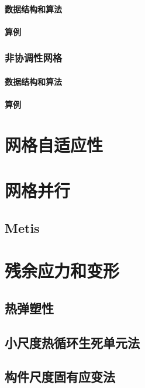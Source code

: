 \subsubsection{数据结构和算法}

\subsubsection{算例}

\subsection{非协调性网格}

\subsubsection{数据结构和算法}

\subsubsection{算例}

\chapter{网格自适应性}

\chapter{网格并行}

\section{Metis}

\chapter{残余应力和变形}

\section{热弹塑性}

\section{小尺度热循环生死单元法}

\section{构件尺度固有应变法}
